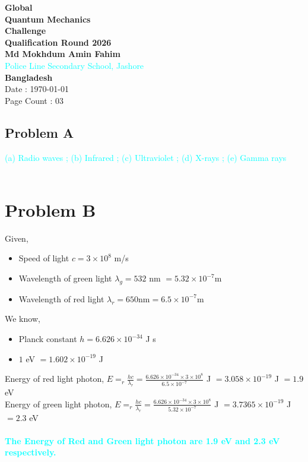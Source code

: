 \documentclass[14pt]{article}
\begin{document}
\begin{center}
	\vspace*{30pt}
    {\Huge \textbf{ Global}} \\[15pt]
    {\HUGE \textbf{Quantum Mechanics}}\\[15pt]
    {\Huge \textbf{Challenge}}\\[50pt]
    {\Large \textcolor{goldColor}{\textbf{Qualification Round 2026}}}\\[100pt]
    {\huge \textcolor[HTML]{4DB8D7}{\textbf{Md Mokhdum Amin Fahim}}}\\[30pt]
    {\huge \textcolor{cyan}{Police Line Secondary School, Jashore}}\\[30pt]
    {\huge \textcolor[HTML]{E6E6FA}{\textbf{Bangladesh}}}\\[100pt]
    {\Large Date : \today}\\[15pt]
    {\Large Page Count : 03}
\end{center}

\newpage
\begin{center}
	\section*{\textcolor{goldColor}{\textbf{Problem A}}}
\end{center}
\textcolor{cyan}{
(a) Radio waves
; (b) Infrared
; (c) Ultraviolet
; (d) X-rays
; (e) Gamma rays
}\\\\
\section*{\centering \textcolor{goldColor}{\textbf{Problem B}}}

Given, 
\begin{itemize}
    \item Speed of light $c=3\times10^8$ m/s
    \item Wavelength of green light $\lambda_g=532$ nm $=5.32\times10^{-7} $m
    \item Wavelength of red light $\lambda_r=650$nm$=6.5\times10^{-7} $m
\end{itemize}
We know,
\begin{itemize}
    \item Planck constant $h=6.626\times10^{-34}$ J s
    \item $1$ eV $=1.602\times10^{-19}$ J
\end{itemize}
Energy of red light photon, $E=_r\frac{hc}{\lambda_r}=\frac{6.626\times10^{-34}\times3\times10^8}{6.5\times10^{-7}}$ J $=3.058\times10^{-19}$ J $=1.9$ eV \\
Energy of green light photon, $E=_r\frac{hc}{\lambda_r}=\frac{6.626\times10^{-34}\times3\times10^8}{5.32\times10^{-7}}$ J $=3.7365\times10^{-19}$ J $=2.3$ eV \\\\
\textcolor{cyan}{\textbf{The Energy of Red and Green light photon are 1.9 eV and 2.3 eV respectively.}}\\
\end{document}
